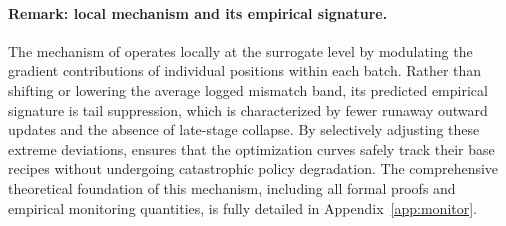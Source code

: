  \paragraph{Remark: local mechanism and its empirical signature.}
The mechanism of \satr{} operates locally at the surrogate level by modulating the gradient contributions of individual positions within each batch. Rather than shifting or lowering the average logged mismatch band, its predicted empirical signature is tail suppression, which is characterized by fewer runaway outward updates and the absence of late-stage collapse. By selectively adjusting these extreme deviations, \satr{} ensures that the optimization curves safely track their base recipes without undergoing catastrophic policy degradation. The comprehensive theoretical foundation of this mechanism, including all formal proofs and empirical monitoring quantities, is fully detailed in Appendix~\ref{app:monitor}.
 
